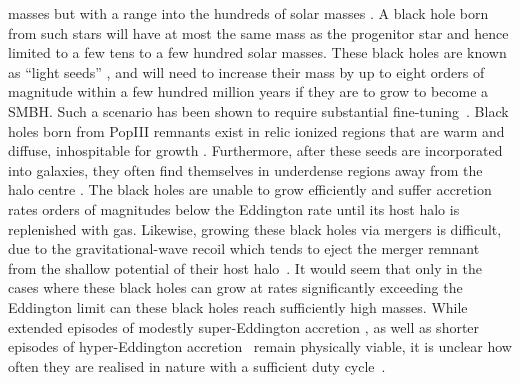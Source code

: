 \documentclass[twocolumn,iop,revtex4]{openjournal}
\begin{document}
masses but with a range into the hundreds of solar masses \citep{Stacy_2010, Stacy_2012, Stacy_2014,
  Hirano_2014,Hirano_2015}. A black hole born from such stars will have at most the same mass as the progenitor star and hence 
limited to
a few tens to a few hundred solar masses. These black holes are known as ``light seeds'' \citep[e.g.][]{Volonteri_2010a},
and will need to increase their mass by up to
eight orders of magnitude within a few hundred million years if they are to grow to become a SMBH. Such
a scenario has been shown to require substantial fine-tuning~\citep{Tanaka_2009,Tanaka_2012}.
Black holes born from PopIII remnants exist
in relic ionized regions that are warm and diffuse, inhospitable for growth
\citep{Whalen_2004, Milosavljevic_2009, Alvarez_2009}. Furthermore, after these seeds are incorporated into galaxies,
they often find themselves in underdense regions away from the halo centre \citep{Smith_2018}.
The black holes
are unable to grow efficiently and suffer accretion rates orders of magnitudes below the Eddington
rate until its host halo is replenished with gas. 
Likewise, growing these black holes via mergers is difficult, due to the gravitational-wave recoil
which tends to eject the merger remnant from the shallow potential of their host halo~\citep{Haiman_2004}.
It would seem that only in the cases where these 
black holes can grow at rates significantly
exceeding the Eddington limit can these black holes reach sufficiently high masses. While extended episodes of modestly 
super-Eddington accretion \citep{Madau_2001, Madau_2014, Alexander_2014,
  Lupi_2016}, as well as shorter episodes of hyper-Eddington accretion~\citep{Inayoshi_2018}
remain physically viable, it is unclear how often they are realised in nature with a
sufficient duty cycle~\citep{Pacucci_2017}.
\end{document}
